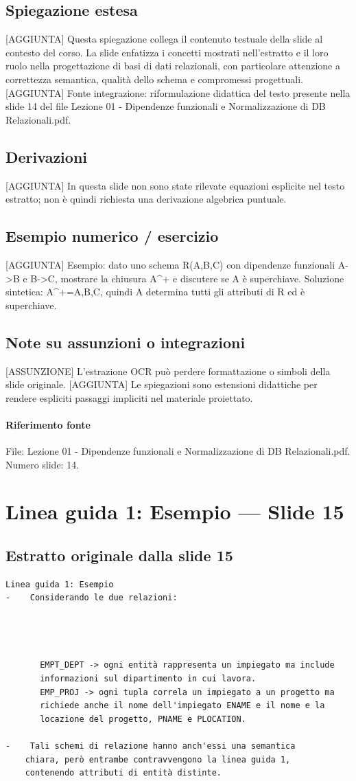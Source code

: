 \documentclass[11pt]{article}
\begin{document}
\subsection*{Spiegazione estesa}
[AGGIUNTA] Questa spiegazione collega il contenuto testuale della slide al contesto del corso. La slide enfatizza i concetti mostrati nell'estratto e il loro ruolo nella progettazione di basi di dati relazionali, con particolare attenzione a correttezza semantica, qualità dello schema e compromessi progettuali.
[AGGIUNTA] Fonte integrazione: riformulazione didattica del testo presente nella slide 14 del file Lezione 01 - Dipendenze funzionali e Normalizzazione di DB Relazionali.pdf.
\subsection*{Derivazioni}
[AGGIUNTA] In questa slide non sono state rilevate equazioni esplicite nel testo estratto; non è quindi richiesta una derivazione algebrica puntuale.
\subsection*{Esempio numerico / esercizio}
[AGGIUNTA] Esempio: dato uno schema R(A,B,C) con dipendenze funzionali A->B e B->C, mostrare la chiusura A^+ e discutere se A è superchiave. Soluzione sintetica: A^+={A,B,C}, quindi A determina tutti gli attributi di R ed è superchiave.
\subsection*{Note su assunzioni o integrazioni}
[ASSUNZIONE] L'estrazione OCR può perdere formattazione o simboli della slide originale.
[AGGIUNTA] Le spiegazioni sono estensioni didattiche per rendere espliciti passaggi impliciti nel materiale proiettato.
\paragraph{Riferimento fonte} File: Lezione 01 - Dipendenze funzionali e Normalizzazione di DB Relazionali.pdf. Numero slide: 14.
\section{Linea guida 1: Esempio --- Slide 15}
\subsection*{Estratto originale dalla slide 15}
\begin{lstlisting}
Linea guida 1: Esempio
-    Considerando le due relazioni:




       EMPT_DEPT -> ogni entità rappresenta un impiegato ma include
       informazioni sul dipartimento in cui lavora.
       EMP_PROJ -> ogni tupla correla un impiegato a un progetto ma
       richiede anche il nome dell'impiegato ENAME e il nome e la
       locazione del progetto, PNAME e PLOCATION.

-    Tali schemi di relazione hanno anch'essi una semantica
    chiara, però entrambe contravvengono la linea guida 1,
    contenendo attributi di entità distinte.
\end{lstlisting}
\end{document}

